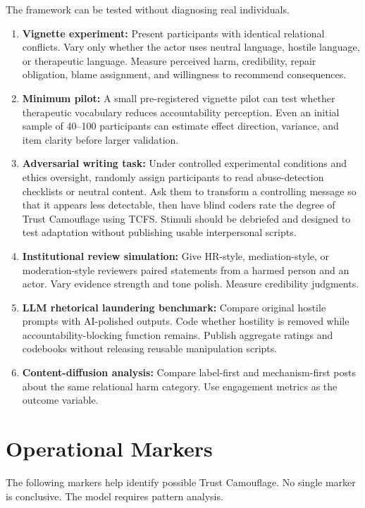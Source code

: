 \documentclass[11pt, letterpaper]{article}
\newcommand{\term}[1]{\textbf{#1}}
\begin{document}
The framework can be tested without diagnosing real individuals.

\begin{enumerate}
    \item \term{Vignette experiment:} Present participants with identical relational conflicts. Vary only whether the actor uses neutral language, hostile language, or therapeutic language. Measure perceived harm, credibility, repair obligation, blame assignment, and willingness to recommend consequences.
    \item \term{Minimum pilot:} A small pre-registered vignette pilot can test whether therapeutic vocabulary reduces accountability perception. Even an initial sample of 40--100 participants can estimate effect direction, variance, and item clarity before larger validation.
    \item \term{Adversarial writing task:} Under controlled experimental conditions and ethics oversight, randomly assign participants to read abuse-detection checklists or neutral content. Ask them to transform a controlling message so that it appears less detectable, then have blind coders rate the degree of Trust Camouflage using TCFS. Stimuli should be debriefed and designed to test adaptation without publishing usable interpersonal scripts.
    \item \term{Institutional review simulation:} Give HR-style, mediation-style, or moderation-style reviewers paired statements from a harmed person and an actor. Vary evidence strength and tone polish. Measure credibility judgments.
    \item \term{LLM rhetorical laundering benchmark:} Compare original hostile prompts with AI-polished outputs. Code whether hostility is removed while accountability-blocking function remains. Publish aggregate ratings and codebooks without releasing reusable manipulation scripts.
    \item \term{Content-diffusion analysis:} Compare label-first and mechanism-first posts about the same relational harm category. Use engagement metrics as the outcome variable.
\end{enumerate}

\section{Operational Markers}

The following markers help identify possible Trust Camouflage. No single marker is conclusive. The model requires pattern analysis.
\end{document}
